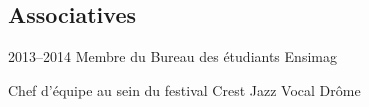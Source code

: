 \subsection{Associatives}

\cventry
  {2013--2014}
  {Membre du Bureau des étudiants}
  {}
  {Ensimag}
  {}
  {}

\cventry
  {}
  {Chef d'équipe au sein du festival Crest Jazz Vocal}
  {}
  {Drôme}
  {}
  {}